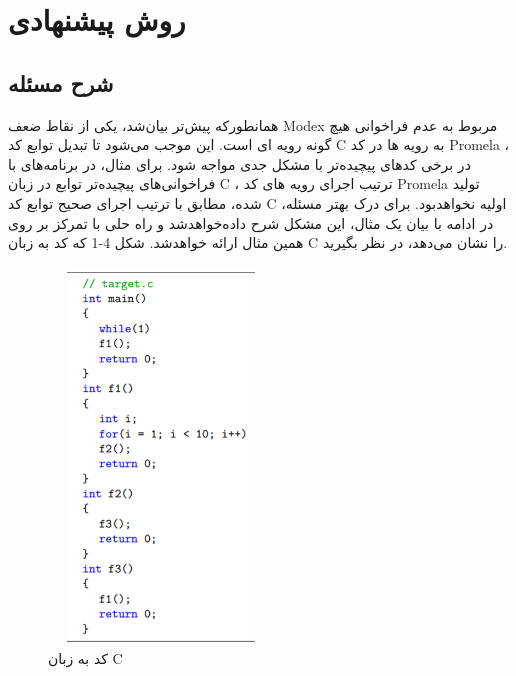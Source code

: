 \chapter{روش پیشنهادی}

\section{شرح مسئله}
همانطورکه پیش‌تر بیان‌شد، یکی از نقاط ضعف Modex مربوط به عدم فراخوانی هیچ گونه رویه ای است. این موجب می‌شود تا تبدیل توابع کد C به رویه ها در کد Promela ، در برخی کدهای پیچیده‌تر با مشکل جدی مواجه شود. برای مثال، در برنامه‌های با فراخوانی‌های پیچیده‌تر توابع در زبان C ، ترتیب اجرای رویه های کد Promela تولید شده، مطابق با ترتیب اجرای صحیح توابع کد C اولیه نخواهدبود. برای درک بهتر مسئله، در ادامه با بیان یک مثال، این مشکل شرح داده‌خواهدشد و راه حلی با تمرکز بر روی همین مثال ارائه خواهدشد.
شکل 4-1 که کد به زبان C را نشان می‌دهد، در نظر بگیرید.

 \begin{figure}
	\centering
	\includegraphics[height=10cm,width=6cm]{b.png}
	\caption{کد به زبان C}
	\centering
\end{figure}




